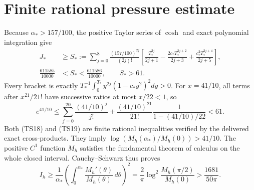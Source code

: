\documentclass[11pt]{article}
\newcommand{\dd}{\,d}
\begin{document}
\section{Finite rational pressure estimate}
Because $\alpha_*>157/100$, the positive Taylor series of $\cosh$
and exact polynomial integration give
\begin{equation}\tag{TS18}\begin{aligned}
 J_*&\geq S_*:=\sum_{j=0}^8\frac{(157/100)^{2j}}{(2j)!}
 \left[\frac{T_*^{2j}}{2j+1}-\frac{2c_*T_*^{2j+2}}{2j+3}
                +\frac{c_*^2T_*^{2j+4}}{2j+5}\right],\\
 \frac{611585}{10000}&<S_*<\frac{611586}{10000},\qquad S_*>61.
\end{aligned}\end{equation}
Every bracket is exactly
$T_*^{-1}\int_0^{T_*}y^{2j}(1-c_*y^2)^2dy>0$.
For $x=41/10$, all terms after $x^{21}/21!$ have successive
ratios at most $x/22<1$, so
\begin{equation}\tag{TS19}
 e^{41/10}\leq\sum_{j=0}^{20}\frac{(41/10)^j}{j!}
 +\frac{(41/10)^{21}}{21!}\frac1{1-(41/10)/22}<61.
\end{equation}
Both (TS18) and (TS19) are finite rational inequalities verified
by the delivered exact cross-products. They imply
$\log(M_h(\alpha_*)/M_h(0))>41/10$. The positive $C^1$ function
$M_h$ satisfies the fundamental theorem of calculus on the whole
closed interval. Cauchy--Schwarz thus proves
\begin{equation}\tag{TS20}
 I_h\geq\frac1{\alpha_*}
 \left(\int_0^{\alpha_*}\frac{M_h'(\theta)}{M_h(\theta)}\dd\theta\right)^2
 =\frac2\pi\log^2\frac{M_h(\pi/2)}{M_h(0)}
 >\frac{1681}{50\pi}.
\end{equation}
\end{document}
